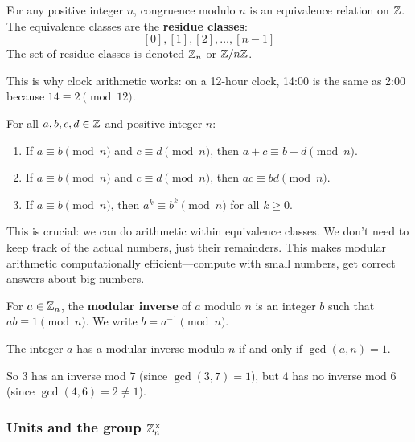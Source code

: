 \begin{theorem}
For any positive integer $n$, congruence modulo $n$ is an equivalence relation on $\mathbb{Z}$. The equivalence classes are the \textbf{residue classes}:
\[
[0], [1], [2], \ldots, [n-1]
\]
The set of residue classes is denoted $\mathbb{Z}_n$ or $\mathbb{Z}/n\mathbb{Z}$.
\end{theorem}

This is why clock arithmetic works: on a 12-hour clock, 14:00 is the same as 2:00 because $14 \equiv 2 \pmod{12}$.

\begin{theorem}
For all $a, b, c, d \in \mathbb{Z}$ and positive integer $n$:
\begin{enumerate}
  \item If $a \equiv b \pmod{n}$ and $c \equiv d \pmod{n}$, then $a + c \equiv b + d \pmod{n}$.
  \item If $a \equiv b \pmod{n}$ and $c \equiv d \pmod{n}$, then $ac \equiv bd \pmod{n}$.
  \item If $a \equiv b \pmod{n}$, then $a^k \equiv b^k \pmod{n}$ for all $k \geq 0$.
\end{enumerate}
\end{theorem}

This is crucial: we can do arithmetic within equivalence classes. We don't need to keep track of the actual numbers, just their remainders. This makes modular arithmetic computationally efficient---compute with small numbers, get correct answers about big numbers.

\begin{definition}
For $a \in \mathbb{Z}_n$, the \textbf{modular inverse} of $a$ modulo $n$ is an integer $b$ such that $ab \equiv 1 \pmod{n}$. We write $b = a^{-1} \pmod{n}$.
\end{definition}

\begin{theorem}
The integer $a$ has a modular inverse modulo $n$ if and only if $\gcd(a, n) = 1$.
\end{theorem}

So $3$ has an inverse mod $7$ (since $\gcd(3,7) = 1$), but $4$ has no inverse mod $6$ (since $\gcd(4,6) = 2 \neq 1$).

\subsubsection*{Units and the group $\mathbb{Z}_n^\times$}

